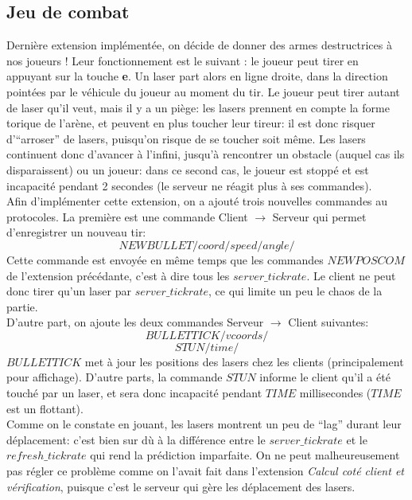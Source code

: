 \documentclass{article}
\begin{document}
\subsection{Jeu de combat}
Dernière extension implémentée, on décide de donner des armes destructrices à nos joueurs ! Leur fonctionnement est le suivant : le joueur peut tirer en appuyant sur la touche \textbf{e}. Un laser part alors en ligne droite, dans la direction pointées par le véhicule du joueur au moment du tir. Le joueur peut tirer autant de laser qu'il veut, mais il y a un piège: les lasers prennent en compte la forme torique de l'arène, et peuvent en plus toucher leur tireur: il est donc risquer d'``arroser'' de lasers, puisqu'on risque de se toucher soit même. Les lasers continuent donc d'avancer à l'infini, jusqu'à rencontrer un obstacle (auquel cas ils disparaissent) ou un joueur: dans ce second cas, le joueur est stoppé et est incapacité pendant 2 secondes (le serveur ne réagit plus à ses commandes).\\
Afin d'implémenter cette extension, on a ajouté trois nouvelles commandes au protocoles. La première est une commande Client $\rightarrow$ Serveur qui permet d'enregistrer un nouveau tir:
$$NEWBULLET/coord/speed/angle/$$
Cette commande est envoyée en même temps que les commandes $NEWPOSCOM$ de l'extension précédante, c'est à dire tous les $server\_tickrate$. Le client ne peut donc tirer qu'un laser par $server\_tickrate$, ce qui limite un peu le chaos de la partie.\\
D'autre part, on ajoute les deux commandes Serveur $\rightarrow$ Client suivantes:
$$BULLETTICK/vcoords/$$
$$STUN/time/$$
$BULLETTICK$ met à jour les positions des lasers chez les clients (principalement pour affichage). D'autre parts, la commande $STUN$ informe le client qu'il a été touché par un laser, et sera donc incapacité pendant $TIME$ millisecondes ($TIME$ est un flottant).\\
Comme on le constate en jouant, les lasers montrent un peu de ``lag'' durant leur déplacement: c'est bien sur dù à la différence entre le $server\_tickrate$ et le $refresh\_tickrate$ qui rend la prédiction imparfaite. On ne peut malheureusement pas régler ce problème comme on l'avait fait dans l'extension \textit{Calcul coté client et vérification}, puisque c'est le serveur qui gère les déplacement des lasers.
\end{document}
